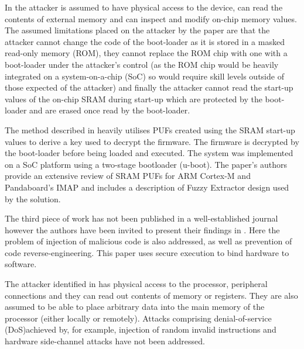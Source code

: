 In \cite{Schaller2014} the attacker is assumed to have physical access to the device, can read the contents of external memory and can inspect and modify on-chip memory values. The assumed limitations placed on the attacker by the paper are that the attacker cannot change the code of the boot-loader as it is stored in a masked read-only memory (ROM), they cannot replace the ROM chip with one with a boot-loader under the attacker's control (as the ROM chip would be heavily integrated on a system-on-a-chip (SoC) so would require skill levels outside of those expected of the attacker) and finally the attacker cannot read the start-up values of the on-chip SRAM during start-up which are protected by the boot-loader and are erased once read by the boot-loader.

The method described in \cite{Schaller2014} heavily utilises PUFs created using the SRAM start-up values to derive a key used to decrypt the firmware. The firmware is decrypted by the boot-loader before being loaded and executed. The system was implemented on a SoC platform using a two-stage bootloader (u-boot). The paper's authors provide an extensive review of SRAM PUFs for ARM Cortex-M and Pandaboard's IMAP and includes a description of Fuzzy Extractor design used by the solution.

The third piece of work \cite{Kleber2015} has not been published in a well-established journal however the authors have been invited to present their findings in \cite{Kleber2015a}. Here the problem of injection of malicious code is also addressed, as well as prevention of code reverse-engineering. This paper uses secure execution to bind hardware to software.

The attacker identified in \cite{Kleber2015} has physical access to the processor, peripheral connections and they can read out contents of memory or registers. They are also assumed to be able to place arbitrary data into the main memory of the processor (either locally or remotely). Attacks comprising denial-of-service (DoS)achieved by, for example, injection of random invalid instructions and hardware side-channel attacks have not been addressed.


